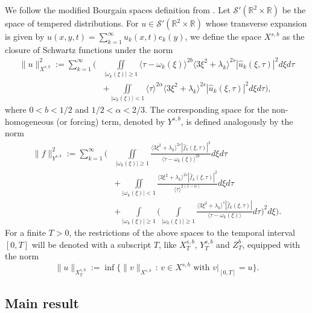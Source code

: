 \documentclass[11pt]{article}
\numberwithin{equation}{section}
\begin{document}
We follow the modified Bourgain spaces definition from \cite{CK, MP}. Let $\mathcal{S}'(\mathbb{R}^2 \times \mathbb{R})$ be the space of tempered distributions. For $u \in \mathcal{S}'(\mathbb{R}^2 \times \mathbb{R})$ whose transverse expansion is given by $u(x,y,t) = \sum_{k=1}^{\infty} u_k(x,t)e_k(y)$, we define the space $X^{s,b}$ as the closure of Schwartz functions under the norm
\begin{equation}
\begin{aligned}
\|u\|_{X^{s,b}}^2 := \sum_{k=1}^{\infty} \Bigg( &\underset{|\omega_k(\xi)| \ge 1}{\iint} \langle \tau-\omega_k(\xi)\rangle^{2b}\langle 3\xi^{2}+\lambda_{k}\rangle^{2s} |\widehat{u}_k(\xi,\tau)|^2 d\xi d\tau \\ &+ \underset{|\omega_k(\xi)| < 1}{\iint} \langle \tau \rangle^{2\alpha}\langle3\xi^{2}+\lambda_{k}\rangle^{2s} |\widehat{u}_k(\xi,\tau)|^2 d\xi d\tau \Bigg),\end{aligned}
\end{equation}
where $0<b<1/2$ and $1/2<\alpha <2/3$. The corresponding space for the non-homogeneous (or forcing) term, denoted by $Y^{s,b}$, is defined analogously by the norm
\begin{equation}
\begin{aligned}
    \|f\|_{Y^{s,b}}^2 := \sum_{k=1}^{\infty} \Bigg( &\underset{|\omega_k(\xi)| \ge 1}{\iint} \frac{\langle3\xi^{2}+\lambda_{k}\rangle^{2s}|\widehat{f}_k(\xi,\tau)|^2}{\langle \tau-\omega_k(\xi)\rangle^{2b}} d\xi d\tau \\ &+ \underset{|\omega_k(\xi)| < 1}{\iint} \frac{\langle3\xi^{2}+\lambda_{k}\rangle^{2s}|\widehat{f}_k(\xi,\tau)|^2}{\langle \tau \rangle^{2(1-\alpha)}} d\xi d\tau\\
    &+ \underset{|\omega_k(\xi)| \ge 1}{\int}\Bigg(\underset{|\omega_k(\xi)| \ge 1}{\int} \frac{\langle3\xi^{2}+\lambda_{k}\rangle^{s}|\widehat{f}_k(\xi,\tau)|}{\langle \tau-\omega_k(\xi)\rangle} d\tau\Bigg)^{2} d\xi\Bigg).
    \end{aligned}
\end{equation}
For a finite $T>0$, the restrictions of the above spaces to the temporal interval $[0,T]$ will be denoted with a subscript $T$, like $X^{s,b}_{T}$, $Y^{s,b}_{T}$ and $Z^{b}_{T}$, equipped with the norm
\begin{equation}\|u\|_{X^{s,b}_T} := \inf \big\{ \|v\|_{X^{s,b}} \,:\, v \in X^{s,b} \text{ with } v|_{[0,T]} = u \big\}.\end{equation}

\subsection{Main result}\label{sub2.3}
\end{document}
